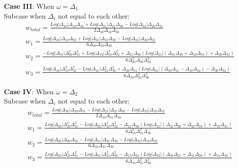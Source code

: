 \documentclass[10pt]{article}
\begin{document}
\textbf{Case III}: When $\omega=\Delta_{1}$\\

Subcase when $\Delta_i$ not equal to each other:\\

\begin{subequations}\label{wtt9}
\begin{align}
&w_{total}=\frac{Log|\Delta_{10}|\Delta_{10}\Delta_{32}+Log|\Delta_{21}|\Delta_{21}\Delta_{30}-Log|\Delta_{31}|\Delta_{20}\Delta_{31}}{2\Delta_{20}\Delta_{32}\Delta_{30}}\\
&w_{1}=\frac{Log|\Delta_{10}|\Delta_{10}\Delta_{32}+Log|\Delta_{21}|\Delta_{21}\Delta_{30}-Log|\Delta_{31}|\Delta_{20}\Delta_{31}}{6\Delta_{20}\Delta_{32}\Delta_{30}}\\
&w_{2}=\frac{-Log|\Delta_{31}|\Delta_{20}^2\Delta_{31}^2+Log|\Delta_{10}|\Delta_{10}^2\Delta_{32}^2+\Delta_{21}\Delta_{30}(Log|\Delta_{21}|(\Delta_{31}\Delta_{20}+\Delta_{32}\Delta_{10})+\Delta_{20}\Delta_{32})}{6\Delta_{20}^2\Delta_{30}\Delta_{32}^2}\\
&w_{3}=\frac{Log|\Delta_{10}|\Delta_{10}^2\Delta_{32}^2-Log|\Delta_{21}|\Delta_{21}^2\Delta_{30}^2+\Delta_{20}\Delta_{31}(Log|\Delta_{31}|(\Delta_{30}\Delta_{21}-\Delta_{10}\Delta_{32})-\Delta_{30}\Delta_{32})}{6\Delta_{20}\Delta_{32}^2\Delta_{30}^2}
\end{align}
\end{subequations}

\textbf{Case IV}: When $\omega=\Delta_{2}$\\

Subcase when $\Delta_i$ not equal to each other:\\

\begin{subequations}\label{wtt10}
\begin{align}
&w_{total}=\frac{Log|\Delta_{20}|\Delta_{20}\Delta_{31}-Log|\Delta_{21}|\Delta_{21}\Delta_{30}-Log|\Delta_{32}|\Delta_{10}\Delta_{32}}{2\Delta_{10}\Delta_{31}\Delta_{30}}\\
&w_{1}=\frac{Log|\Delta_{20}|\Delta_{20}^2\Delta_{31}^2-Log|\Delta_{32}|\Delta_{10}^2\Delta_{32}^2-\Delta_{21}\Delta_{30}(Log|\Delta_{21}|(\Delta_{31}\Delta_{20}+\Delta_{32}\Delta_{10})+\Delta_{10}\Delta_{31})}{6\Delta_{10}^2\Delta_{31}^2\Delta_{30}}\\
&w_{2}=\frac{Log|\Delta_{20}|\Delta_{20}\Delta_{31}-Log|\Delta_{21}|\Delta_{21}\Delta_{30}-Log|\Delta_{32}|\Delta_{10}\Delta_{32}}{6\Delta_{10}\Delta_{31}\Delta_{30}}\\
&w_{3}=\frac{Log|\Delta_{20}|\Delta_{20}^2\Delta_{31}^2-Log|\Delta_{21}|\Delta_{21}^2\Delta_{30}^2-\Delta_{10}\Delta_{32}(Log|\Delta_{32}|(\Delta_{30}\Delta_{21}+\Delta_{31}\Delta_{20})+\Delta_{31}\Delta_{30})}{6\Delta_{10}\Delta_{31}^2\Delta_{30}^2}
\end{align}
\end{subequations}
\end{document}
